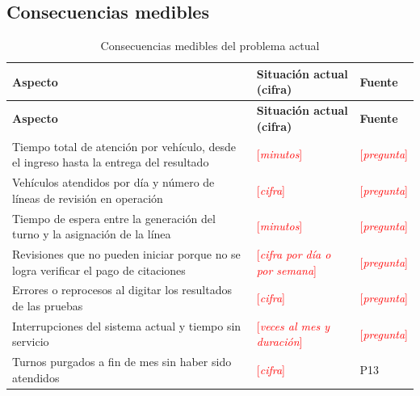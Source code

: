\documentclass[11pt,a4paper]{article}
\newcommand{\pendiente}[1]{\textcolor{red}{[\textit{#1}]}}
\begin{document}
\subsection{Consecuencias medibles}
\begin{xltabular}{\textwidth}{L{5cm}XL{2.2cm}}
  \caption{Consecuencias medibles del problema actual}\label{tab:consecuencias}\\
  \toprule
  \textbf{Aspecto} & \textbf{Situación actual (cifra)} & \textbf{Fuente} \\
  \midrule
  \endfirsthead
  \toprule
  \textbf{Aspecto} & \textbf{Situación actual (cifra)} & \textbf{Fuente} \\
  \midrule
  \endhead
  \bottomrule
  \endfoot
  Tiempo total de atención por vehículo, desde el ingreso hasta la entrega del resultado & \pendiente{minutos} & \pendiente{pregunta} \\
    Vehículos atendidos por día y número de líneas de revisión en operación & \pendiente{cifra} & \pendiente{pregunta} \\
    Tiempo de espera entre la generación del turno y la asignación de la línea & \pendiente{minutos} & \pendiente{pregunta} \\
    Revisiones que no pueden iniciar porque no se logra verificar el pago de citaciones & \pendiente{cifra por día o por semana} & \pendiente{pregunta} \\
    Errores o reprocesos al digitar los resultados de las pruebas & \pendiente{cifra} & \pendiente{pregunta} \\
    Interrupciones del sistema actual y tiempo sin servicio & \pendiente{veces al mes y duración} & \pendiente{pregunta} \\
    Turnos purgados a fin de mes sin haber sido atendidos & \pendiente{cifra} & P13 \\
\end{xltabular}
\end{document}
